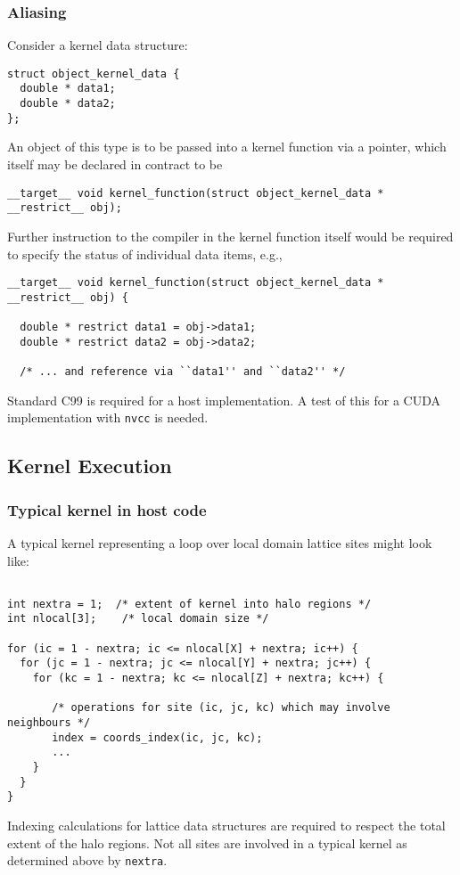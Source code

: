 \subsubsection{Aliasing}
Consider a kernel data structure:
\begin{lstlisting}
struct object_kernel_data {
  double * data1;
  double * data2;
};
\end{lstlisting}
An object of this type is to be passed into a kernel function via a pointer,
which itself may be declared in contract to be
\begin{lstlisting}
__target__ void kernel_function(struct object_kernel_data * __restrict__ obj);
\end{lstlisting}
Further instruction to the compiler in the kernel function itself would
be required to specify the status of individual data items, e.g.,
\begin{lstlisting}
__target__ void kernel_function(struct object_kernel_data * __restrict__ obj) {

  double * restrict data1 = obj->data1;
  double * restrict data2 = obj->data2;

  /* ... and reference via ``data1'' and ``data2'' */
\end{lstlisting}
Standard C99 is required for a host implementation.
A test of this for a CUDA implementation with \texttt{nvcc} is needed.


\subsection{Kernel Execution}

\subsubsection{Typical kernel in host code}

A typical kernel representing a loop over local domain lattice sites
might look like:
\begin{lstlisting}

int nextra = 1;  /* extent of kernel into halo regions */
int nlocal[3];    /* local domain size */

for (ic = 1 - nextra; ic <= nlocal[X] + nextra; ic++) {
  for (jc = 1 - nextra; jc <= nlocal[Y] + nextra; jc++) {
    for (kc = 1 - nextra; kc <= nlocal[Z] + nextra; kc++) {

       /* operations for site (ic, jc, kc) which may involve neighbours */
       index = coords_index(ic, jc, kc);
       ...
    }
  }
}

\end{lstlisting}
Indexing calculations for lattice data structures are required to
respect the total extent of the halo regions. Not all sites are
involved in a typical kernel as determined above by \texttt{nextra}.

